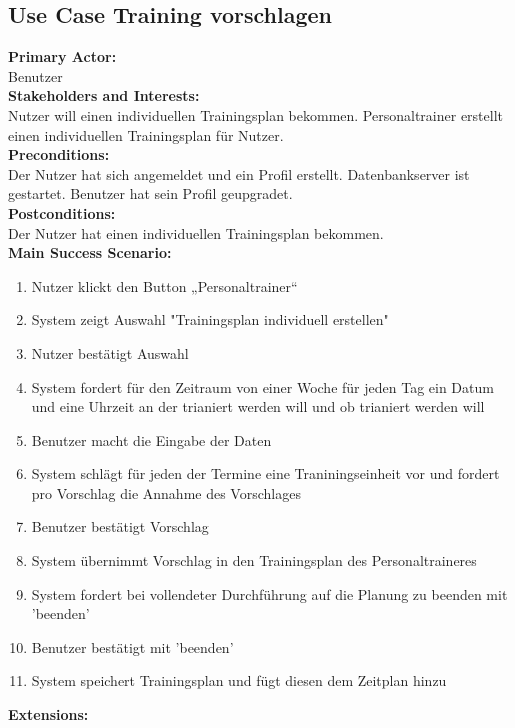 \documentclass[12pt,a4paper,onecolumn]{article}
\begin{document}
\subsection{Use Case Training vorschlagen}
\textbf{Primary Actor:}\\ Benutzer\\
\textbf{Stakeholders and Interests:}\\
Nutzer will einen individuellen Trainingsplan bekommen. Personaltrainer erstellt einen individuellen Trainingsplan für Nutzer.\\
\textbf{Preconditions:} \\ Der Nutzer hat sich angemeldet und ein Profil erstellt. Datenbankserver ist gestartet. Benutzer hat sein Profil geupgradet.\\
\textbf{Postconditions:}\\Der Nutzer hat einen individuellen Trainingsplan bekommen.\\
\textbf{Main Success Scenario:}
\begin{enumerate}
    \item Nutzer klickt den Button „Personaltrainer“
    \item System zeigt Auswahl "Trainingsplan individuell erstellen"
    \item Nutzer bestätigt Auswahl
    \item System fordert für den Zeitraum von einer Woche für jeden Tag ein Datum und eine Uhrzeit an der trianiert werden will und ob trianiert werden will
    \item Benutzer macht die Eingabe der Daten
    \item System schlägt für jeden der Termine eine Traniningseinheit vor und fordert pro Vorschlag die Annahme des Vorschlages
    \item Benutzer bestätigt Vorschlag
    \item System übernimmt Vorschlag in den Trainingsplan des Personaltraineres
    \item System fordert bei vollendeter Durchführung auf die Planung zu beenden mit 'beenden'
    \item Benutzer bestätigt mit 'beenden'
    \item System speichert Trainingsplan und fügt diesen dem Zeitplan hinzu
\end{enumerate} 
\textbf{Extensions:}\\
\end{document}
